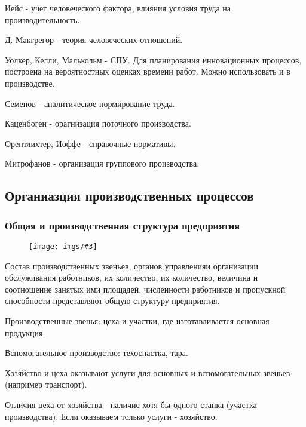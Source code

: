 \documentclass[14pt,a4paper,oneside]{extarticle}
\newcommand{\pic}[3]{
	\begin{figure}[#1]
		\begin{center}
			\texttt{[image: imgs/\#3]}
		\end{center}
	\end{figure}
}
\begin{document}
Иейс - учет человеческого фактора, влияния условия труда на производительность.

Д. Макгрегор - теория человеческих отношений.

Уолкер, Келли, Малькольм - СПУ. Для планирования инновационных процессов, построена на вероятностных оценках времени работ. Можно использовать и в производстве.

Семенов - аналитическое нормирование труда.

Каценбоген - орагнизация поточного производства.

Орентлихтер, Иоффе - справочные нормативы.

Митрофанов - организация группового производства.

\subsection{Органиазция производственных процессов}

\subsubsection{Общая и производственная структура предприятия}

\pic{H}{\textwidth}{1}

Состав производственных звеньев, органов управленияи организации обслуживания работников, их количество, их количество, величина и соотношение занятых ими площадей, численности работников и пропускной способности представляют общую структуру предприятия.

Производственные звенья: цеха и участки, где изготавливается основная продукция.

Вспомогательное производство: техоснастка, тара.

Хозяйство и цеха оказывают услуги для основных и вспомогательных звеньев (например транспорт).

Отличия цеха от хозяйства - наличие хотя бы одного станка (участка производства). Если оказываем только услуги - хозяйство.
\end{document}
